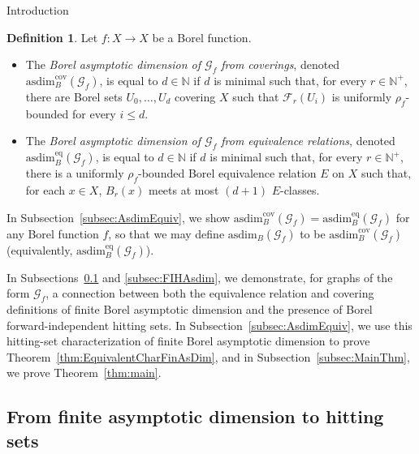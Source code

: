 \documentclass[psamsfonts]{amsart}
\theoremstyle{definition}
\newtheorem{defn}[thm]{Definition}
\newcommand{\N}{\mathbb N}
\newcommand{\asdim}{\text{asdim}}
\theoremstyle{remark}
\numberwithin{equation}{section}
\newcommand\mcal{\mathcal}
\begin{document}
\begin{section}{Introduction}
\begin{defn}
\label{def:Asdim}
    Let $f:X\to X$ be a Borel function.
\begin{itemize}
    \item [(i)] The \emph{Borel asymptotic dimension of $\mcal{G}_f$ from coverings}, denoted $\asdim_B^{\text{cov}}(\mcal{G}_f)$, is equal to $d \in \N$ if $d$ is minimal such that, for every $r\in \N^+$, there are Borel sets $U_0, \dots, U_d$ covering $X$ such that $\mcal{F}_r(U_i)$ is uniformly $\rho_f$-bounded for every $i \leq d$.
    \item [(ii)] The \emph{Borel asymptotic dimension of $\mcal{G}_f$ from equivalence relations}, denoted $\asdim_B^{\text{eq}}(\mcal{G}_f)$, is equal to $d \in \N$ if $d$ is minimal such that, for every $r \in \N^+$, there is a uniformly $\rho_f$-bounded Borel equivalence relation $E$ on $X$ such that, for each $x\in X$, $B_r(x)$ meets at most $(d + 1)$ $E$-classes. 
\end{itemize}
\end{defn}

In Subsection~\ref{subsec:AsdimEquiv}, we show $\asdim^{\text{cov}}_B(\mcal{G}_f) = \asdim^{\text{eq}}_B(\mcal{G}_f)$ for any Borel function $f$, so that we may define $\asdim_B(\mcal{G}_f)$ to be $\asdim^{\text{cov}}_B(\mcal{G}_f)$ (equivalently, $\asdim^{\text{eq}}_B(\mcal{G}_f)$).

In Subsections~\ref{subsec:AsdimFIH} and \ref{subsec:FIHAsdim}, we demonstrate, for graphs of the form $\mcal{G}_f$, a connection between both the equivalence relation and covering definitions of finite Borel asymptotic dimension and the presence of Borel forward-independent hitting sets. In Subsection~\ref{subsec:AsdimEquiv}, we use this hitting-set characterization of finite Borel asymptotic dimension to prove Theorem~\ref{thm:EquivalentCharFinAsDim}, and in Subsection~\ref{subsec:MainThm}, we prove Theorem~\ref{thm:main}.

\subsection{From finite asymptotic dimension to hitting sets}
\label{subsec:AsdimFIH}


\end{section}
\end{document}
